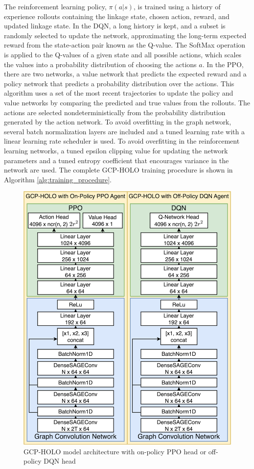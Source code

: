 The reinforcement learning policy, \( \pi(a|s) \), is trained using a history of experience rollouts containing the linkage state, chosen action, reward, and updated linkage state. In the DQN, a long history is kept, and a subset is randomly selected to update the network, approximating the long-term expected reward from the state-action pair known as the Q-value. The SoftMax operation is applied to the Q-values of a given state and all possible actions, which scales the values into a probability distribution of choosing the actions \( a \). In the PPO, there are two networks, a value network that predicts the expected reward and a policy network that predicts a probability distribution over the actions. This algorithm uses a set of the most recent trajectories to update the policy and value networks by comparing the predicted and true values from the rollouts. The actions are selected nondeterministically from the probability distribution generated by the action network. To avoid overfitting in the graph network, several batch normalization layers are included and a tuned learning rate with a linear learning rate scheduler is used. To avoid overfitting in the reinforcement learning networks, a tuned epsilon clipping value for updating the network parameters and a tuned entropy coefficient that encourages variance in the network are used. The complete GCP-HOLO training procedure is shown in Algorithm \ref{alg:training_procedure}.

\begin{figure}
    \centering
    \includegraphics[width=0.7\linewidth]{07_figure_ML_model_architecture.png}
    \caption{GCP-HOLO model architecture with on-policy PPO head or off-policy DQN head}
    \label{fig:ppo-dqn}
\end{figure}

